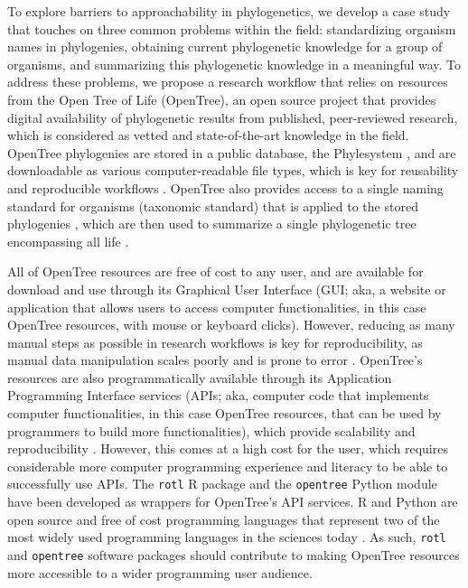 \documentclass[12pt]{article}
\begin{document}
To explore barriers to approachability in phylogenetics, we develop a case study
that touches on three common problems within the field: standardizing
organism names in phylogenies, obtaining current phylogenetic knowledge for a group of organisms,
and summarizing this phylogenetic knowledge in a meaningful way.
To address these problems, we propose a research workflow that relies on resources from the Open
Tree of Life (OpenTree), an open source project that provides
digital availability of phylogenetic results from published, peer-reviewed research, which
is considered as vetted and state-of-the-art knowledge in the field.
OpenTree phylogenies are stored in a public database, the Phylesystem \citep{mctavish2015phylesystem},
and are downloadable as various computer-readable file types, which is key for reusability
and reproducible workflows \citep{wilson2017good}.
OpenTree also provides access to a single naming standard for organisms (taxonomic standard)
that is applied to the stored phylogenies \citep{rees2017automated}, which are
then used to summarize a single phylogenetic tree encompassing all life \citep{opentreeoflife2019synth}.

All of OpenTree resources
are free of cost to any user, and are available for download and use through its Graphical User
Interface (GUI; aka, a website or application that allows users to access computer functionalities, in this case OpenTree resources, with mouse or keyboard clicks).
However, reducing as many manual steps as possible in research workflows is key
for reproducibility, as manual data manipulation scales poorly and is prone to
error \citep{bakken2019journey}.
OpenTree's resources are also programmatically available through its Application
Programming Interface services (APIs; aka, computer code that implements computer functionalities,
in this case OpenTree resources, that can be used by programmers
to build more functionalities),
which provide scalability and reproducibility \citep{opentreeAPIv3}.
However, this comes at a high cost for the user, which requires considerable more
computer programming experience and literacy to be able to successfully use APIs.
The \texttt{rotl} R package \citep{michonneau2016rotl} and the \texttt{opentree} Python module
\citep{mctavish2021opentree} have been developed as wrappers for OpenTree's API services.
R and Python are open source and free of cost programming languages that represent
two of the most widely used programming languages in the sciences today \citep{eglen2009quick, baker2017scientific}.
As such, \texttt{rotl} and \texttt{opentree} software packages should contribute
to making OpenTree resources more accessible to a wider programming user audience.
\end{document}
